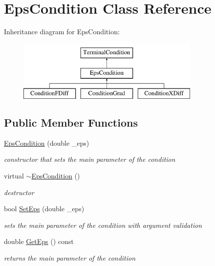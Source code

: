 \hypertarget{class_eps_condition}{}\section{Eps\+Condition Class Reference}
\label{class_eps_condition}
Inheritance diagram for Eps\+Condition\+:\begin{figure}[H]
\begin{center}
\leavevmode
\includegraphics[height=3.000000cm]{class_eps_condition}
\end{center}
\end{figure}
\subsection*{Public Member Functions}
\begin{DoxyCompactItemize}
\item 
\mbox{\label{class_eps_condition_ad6d567f401d6a5028a2d48c61f2ac3d8}} 
\hyperlink{class_eps_condition_ad6d567f401d6a5028a2d48c61f2ac3d8}{Eps\+Condition} (double \+\_\+eps)
\begin{DoxyCompactList}\small\item\em constructor that sets the main parameter of the condition \end{DoxyCompactList}\item 
\mbox{\label{class_eps_condition_a892b576e42fe950c0fea5a3afcf4ea69}} 
virtual \hyperlink{class_eps_condition_a892b576e42fe950c0fea5a3afcf4ea69}{$\sim$\+Eps\+Condition} ()
\begin{DoxyCompactList}\small\item\em destructor \end{DoxyCompactList}\item 
\mbox{\label{class_eps_condition_a8a0fd013059f6f45c1ecfe2a6f38ece7}} 
bool \hyperlink{class_eps_condition_a8a0fd013059f6f45c1ecfe2a6f38ece7}{Set\+Eps} (double \+\_\+eps)
\begin{DoxyCompactList}\small\item\em sets the main parameter of the condition with argument validation \end{DoxyCompactList}\item 
\mbox{\label{class_eps_condition_a0b5c302ebf949287188abf368df4c2b8}} 
double \hyperlink{class_eps_condition_a0b5c302ebf949287188abf368df4c2b8}{Get\+Eps} () const
\begin{DoxyCompactList}\small\item\em returns the main parameter of the condition \end{DoxyCompactList}\end{DoxyCompactItemize}
